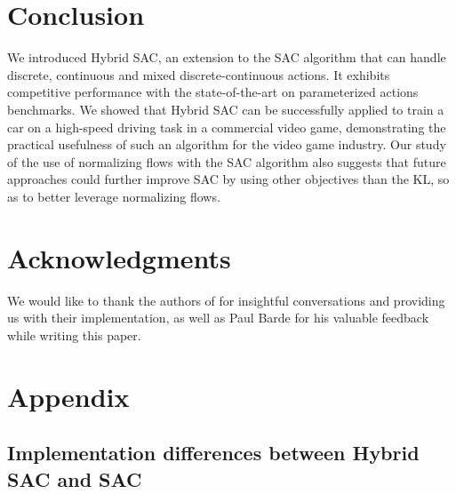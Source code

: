 \documentclass[letterpaper]{article} \usepackage{aaai20}  \usepackage{times}  \usepackage{helvet} \usepackage{courier}  \usepackage[hyphens]{url}  \usepackage{graphicx} \urlstyle{rm} \def\UrlFont{\rm}  \usepackage{graphicx}  \usepackage[section]{placeins}
\begin{document}
\section{Conclusion}

We introduced Hybrid SAC, an extension to the SAC algorithm that can handle discrete, continuous and mixed discrete-continuous actions. It exhibits competitive performance with the state-of-the-art on parameterized actions benchmarks. We showed that Hybrid SAC can be successfully applied to train a car on a high-speed driving task in a commercial video game, demonstrating the practical usefulness of such an algorithm for the video game industry. Our study of the use of normalizing flows with the SAC algorithm also suggests that future approaches could further improve SAC by using other objectives than the KL, so as to better leverage normalizing flows.

\section{Acknowledgments}

We would like to thank the authors of \cite{mazoure2019leveraging} for insightful conversations and providing us with their implementation, as well as Paul Barde for his valuable feedback while writing this paper.   




\newpage

\section{Appendix}





\subsection{Implementation differences between Hybrid SAC and SAC} 
\end{document}
